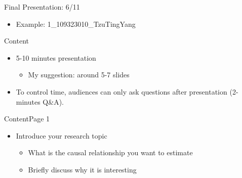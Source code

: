 \documentclass[dvipsnames,hyperref={pdfpagelabels=false}]{beamer}
\begin{document}
\begin{frame}{Final Presentation: 6/11}
\begin{itemize}
\begin{itemize}
	   	\vspace{0.2cm}
	   	\item Example: 1\_109323010\_TzuTingYang
	   		   	\vspace{0.2cm}
	   \end{itemize}
	\end{itemize}
\end{frame}




\begin{frame}{Content}
\begin{itemize} 
	\item  5-10 minutes presentation
	\vspace{0.2cm}
	\begin{itemize} 
		\item My suggestion: around 5-7 slides
		\vspace{0.2cm}
	\end{itemize}
	\item To control time, audiences can only ask questions after presentation (2-minutes Q\&A).
	\vspace{0.2cm}
	
\end{itemize}
\end{frame}




\begin{frame}{Content}{Page 1}
	\begin{itemize} 
		\item Introduce your research topic 
		\vspace{0.2cm}
		\begin{itemize}
			\item What is the causal relationship you want to estimate
			\vspace{0.2cm}
			\item Briefly discuss why it is interesting
	\end{itemize}
	\end{itemize}
\end{frame}
\end{document}
